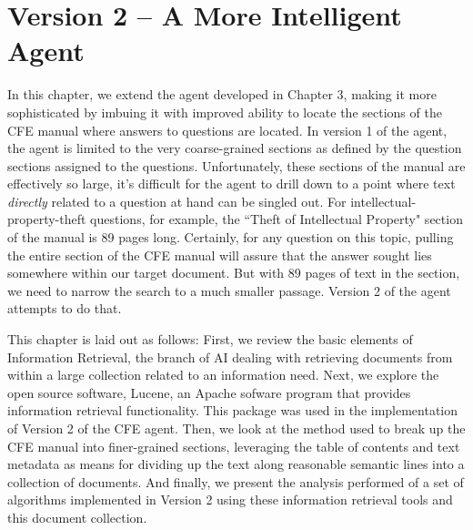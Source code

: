  
\chapter{Version 2 -- A More Intelligent Agent}

In this chapter, we extend the agent developed in Chapter 3, making it more sophisticated by imbuing it with improved ability to locate the sections of the CFE manual where answers to questions are located.  In version 1 of the agent, the agent is limited to the very coarse-grained sections as defined by the question sections assigned to the questions.  Unfortunately, these sections of the manual are effectively so large, it's difficult for the agent to drill down to a point where text \emph{directly} related to a question at hand can be singled out.  For intellectual-property-theft questions, for example, the ``Theft of Intellectual Property" section of the manual is 89 pages long.  Certainly, for any question on this topic, pulling the entire section of the CFE manual will assure that the answer sought lies somewhere within our target document.  But with 89 pages of text in the section, we need to narrow the search to a much smaller passage.  Version 2 of the agent attempts to do that.



This chapter is laid out as follows:  First, we review the basic elements of Information Retrieval, the branch of AI dealing with retrieving documents from within a large collection related to an information need.  Next, we explore the open source software, Lucene, an Apache sofware program that provides information retrieval functionality.  This package was used in the implementation of Version 2 of the CFE agent.  Then, we look at the method used to break up the CFE manual into finer-grained sections, leveraging the table of contents and text metadata as means for dividing up the text along reasonable semantic lines into a collection of documents.  And finally, we present the analysis performed of a set of algorithms implemented in Version 2 using these information retrieval tools and this document collection.

